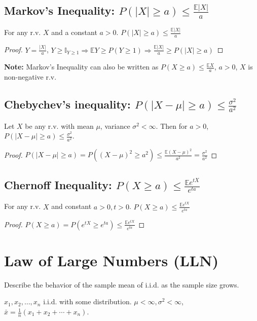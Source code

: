 \documentclass[11pt]{elegantbook}
\begin{document}
\subsection{Markov's Inequality: $P(|X|\geq a)\leq \frac{\mathbb{E}|X|}{a}$}
For any r.v. $X$ and a constant $a>0$. $P(|X|\geq a)\leq \frac{\mathbb{E}|X|}{a}$
\begin{proof}
$Y=\frac{|X|}{a}$, $Y\geq \mathbb{I}_{Y\geq 1} \Rightarrow \mathbb{E}Y\geq P(Y\geq 1) \Rightarrow \frac{\mathbb{E}|X|}{a}\geq P(|X|\geq a)$
\end{proof}
\textbf{Note:} Markov's Inequality can also be written as $P(X\geq a)\leq \frac{\mathbb{E}X}{a}$, $a>0$, $X$ is non-negative r.v.

\subsection{Chebychev's inequality: $P(|X-\mu|\geq a)\leq \frac{\sigma^2}{a^2}$}
Let $X$ be any r.v. with mean $\mu$, variance $\sigma^2<\infty$. Then for $a>0$, $P(|X-\mu|\geq a)\leq \frac{\sigma^2}{a^2}$.
\begin{proof}
$P(|X-\mu|\geq a)=P((X
-\mu)^2\geq a^2)\leq \frac{\mathbb{E}(X-\mu)^2}{a^2}=\frac{\sigma^2}{a^2}$
\end{proof}

\subsection{Chernoff Inequality: $P(X\geq a)\leq \frac{\mathbb{E}e^{tX}}{e^{ta}}$}
For any r.v. $X$ and constant $a>0,t>0$. $P(X\geq a)\leq \frac{\mathbb{E}e^{tX}}{e^{ta}}$
\begin{proof}
$P(X\geq a)=P(e^{tX}\geq e^{ta})\leq \frac{\mathbb{E}e^{tX}}{e^{ta}}$
\end{proof}

\section{Law of Large Numbers (LLN)}
Describe the behavior of the sample mean of i.i.d. as the sample size grows.

$x_{1}, x_{2}, \ldots, x_{n}$ i.i.d. with some distribution. $\mu<\infty,\sigma^{2}<\infty$,$\bar{x}=\frac{1}{n}\left(x_{1}+x_{2}+\cdots+x_{n}\right)$.
\end{document}
